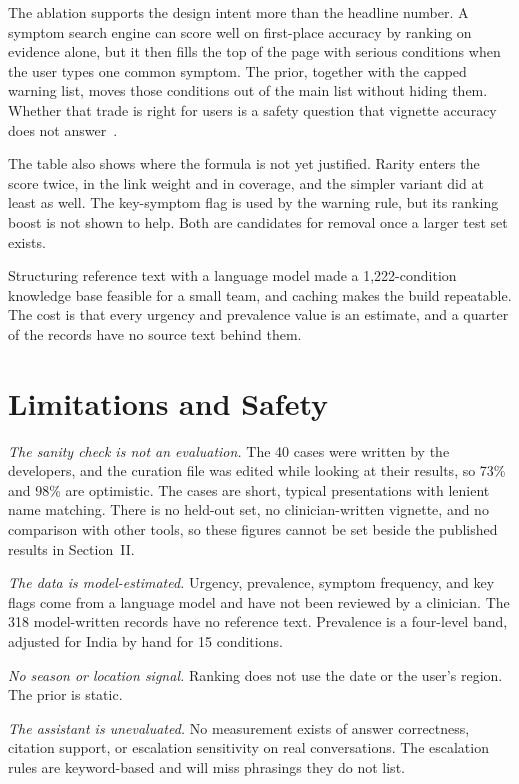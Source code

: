 \documentclass[conference]{IEEEtran}
\begin{document}
The ablation supports the design intent more than the headline number. A symptom search engine can score well on first-place accuracy by ranking on evidence alone, but it then fills the top of the page with serious conditions when the user types one common symptom. The prior, together with the capped warning list, moves those conditions out of the main list without hiding them. Whether that trade is right for users is a safety question that vignette accuracy does not answer~\cite{fraser2018}.

The table also shows where the formula is not yet justified. Rarity enters the score twice, in the link weight and in coverage, and the simpler variant did at least as well. The key-symptom flag is used by the warning rule, but its ranking boost is not shown to help. Both are candidates for removal once a larger test set exists.

Structuring reference text with a language model made a 1,222-condition knowledge base feasible for a small team, and caching makes the build repeatable. The cost is that every urgency and prevalence value is an estimate, and a quarter of the records have no source text behind them.

\section{Limitations and Safety}
\label{sec:limits}

\textit{The sanity check is not an evaluation.} The 40 cases were written by the developers, and the curation file was edited while looking at their results, so 73\% and 98\% are optimistic. The cases are short, typical presentations with lenient name matching. There is no held-out set, no clinician-written vignette, and no comparison with other tools, so these figures cannot be set beside the published results in Section~II.

\textit{The data is model-estimated.} Urgency, prevalence, symptom frequency, and key flags come from a language model and have not been reviewed by a clinician. The 318 model-written records have no reference text. Prevalence is a four-level band, adjusted for India by hand for 15 conditions.

\textit{No season or location signal.} Ranking does not use the date or the user's region. The prior is static.

\textit{The assistant is unevaluated.} No measurement exists of answer correctness, citation support, or escalation sensitivity on real conversations. The escalation rules are keyword-based and will miss phrasings they do not list.
\end{document}
